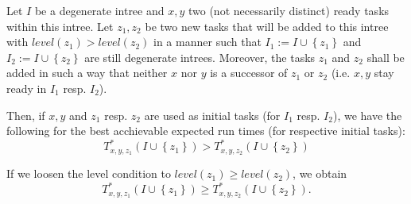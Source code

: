 \begin{lemma}
  \label{lem:p3-adding-tasks-level-keep-scheduled-same-inequality}
  Let $I$ be a degenerate intree and $x, y$ two (not necessarily distinct) ready tasks within this intree. Let $z_1, z_2$ be two new tasks that will be added to this intree with $level(z_1) > level(z_2)$ in a manner such that $I_1:=I\cup\left\{ z_1 \right\}$ and $I_2:=I\cup\left\{ z_2 \right\}$ are still degenerate intrees. Moreover, the tasks $z_1$ and $z_2$ shall be added in such a way that neither $x$ nor $y$ is a successor of $z_1$ or $z_2$ (i.e. $x,y$ stay ready in $I_1$ resp. $I_2$). 

  Then, if $x,y$ and $z_1$ resp. $z_2$ are used as initial tasks (for $I_1$ resp. $I_2$), we have the following for the best acchievable expected run times (for respective initial tasks):
  \begin{equation}
    \label{eq:lemma-p3-adding-tasks-level-keep-scheduled-same-inequality}
    T^{*}_{x,y,z_1}\left(I\cup\left\{ z_1 \right\}\right) > T^{*}_{x,y,z_2}\left( I\cup\left\{ z_2 \right\} \right)
  \end{equation}

  If we loosen the level condition to $level(z_1)\geq level(z_2)$, we obtain
  \begin{equation*}
    T^{*}_{x,y,z_1}\left(I\cup\left\{ z_1 \right\}\right) \geq T^{*}_{x,y,z_2}\left( I\cup\left\{ z_2 \right\} \right).
  \end{equation*}
\end{lemma}

